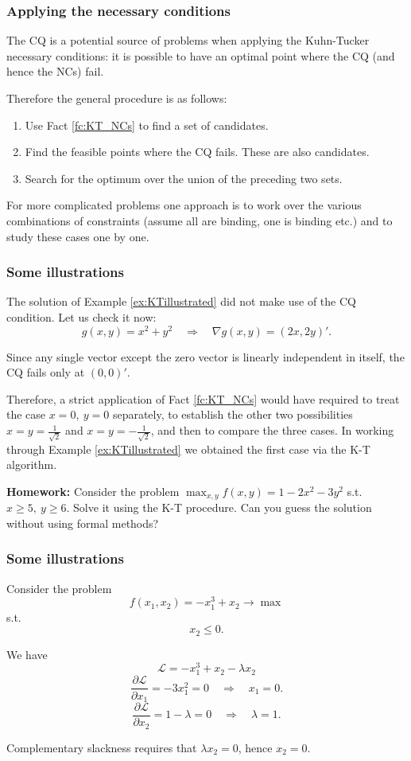 \documentclass[10pt]{beamer}
\theoremstyle{definition}
\begin{document}
\begin{frame}[fragile]
\frametitle{Applying the necessary conditions}
The CQ is a potential source of problems when applying the Kuhn-Tucker necessary conditions: it is possible to have an optimal point where the CQ (and hence the NCs) fail. \bigskip


Therefore the general procedure is as follows:
\begin{enumerate}
\item Use Fact \ref{fc:KT_NCs} to find a set of candidates.
\item Find the feasible points where the CQ fails. These are also candidates.
\item Search for the optimum over the union of the preceding two sets.
\end{enumerate}\bigskip

For more complicated problems one approach is to work over the various combinations of constraints (assume all are binding, one is binding etc.) and to study these cases one by one.
\end{frame}

\begin{frame}[fragile]
\frametitle{Some illustrations}
\begin{example}
The solution of Example \ref{ex:KTillustrated} did not make use of the CQ condition. Let us check it now: \[ g(x,y)=x^2+y^2 \quad \Rightarrow \quad \nabla g(x,y) = (2x,2y)'. \]

Since any single vector except the zero vector is linearly independent in itself, the CQ fails only at $ (0,0)' $.

Therefore, a strict application of Fact \ref{fc:KT_NCs} would have required to treat the case $ x=0,~y=0 $ separately, to establish the other two possibilities $ x=y=\frac{1}{\sqrt{2}} $ and $ x=y=-\frac{1}{\sqrt{2}} $, and then to compare the three cases. In working through Example  \ref{ex:KTillustrated} we obtained the first case via the K-T algorithm.
\label{ex:revisitKTillustrated}
\end{example}\bigskip

\textbf{Homework:} Consider the problem $ \max_{x,y} f(x,y)=1-2x^2-3y^2 $ s.t. $ x\geq 5,~y \geq 6 $. Solve it using the K-T procedure. Can you guess the solution without using formal methods?
\end{frame}

\begin{frame}[fragile]
\frametitle{Some illustrations}
\begin{example}
Consider the problem
\[ f(x_1,x_2) = -x_1^3+x_2 \rightarrow \max \]
s.t. \[ x_2\leq 0. \]

We have \[ \mathcal{L} =  -x_1^3+x_2 - \lambda x_2  \]
\[ \dfrac{\partial \mathcal{L}}{\partial x_1} = -3x_1^2 = 0 \quad \Rightarrow \quad x_1 = 0. \]
\[ \dfrac{\partial \mathcal{L}}{\partial x_2} = 1-\lambda = 0 \quad \Rightarrow \quad \lambda = 1. \]

Complementary slackness requires that $ \lambda x_2 = 0 $, hence $ x_2 = 0 $.
\label{ex:KTfail}
\end{example}
\end{frame}
\end{document}
